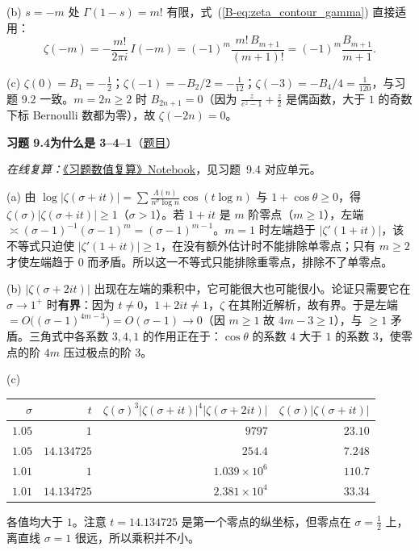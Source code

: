 \documentclass[11pt,a4paper]{article}
\newcommand{\bref}[1]{\ref*{B-#1}}
\newcommand{\Sol}[2]{%
  \par\addvspace{1.2em}\noindent
  \hypertarget{s:#1}{}\textbf{习题 #1\quad #2}\hfill{\small（\hyperlink{q:#1}{题目}）}\par
  \nopagebreak\smallskip}
\begin{document}
(b) $s=-m$ 处 $\Gamma(1-s)=m!$ 有限，式~(\bref{eq:zeta_contour_gamma}) 直接适用：
\[
  \zeta(-m)=-\frac{m!}{2\pi i}\,I(-m)=(-1)^m\frac{m!\,B_{m+1}}{(m+1)!}=(-1)^m\frac{B_{m+1}}{m+1}.
\]

(c) $\zeta(0)=B_1=-\tfrac12$；$\zeta(-1)=-B_2/2=-\tfrac1{12}$；$\zeta(-3)=-B_4/4=\tfrac1{120}$，与习题 9.2 一致。$m=2n\ge2$ 时 $B_{2n+1}=0$（因为 $\frac z{e^z-1}+\frac z2$ 是偶函数，大于 $1$ 的奇数下标 Bernoulli 数都为零），故 $\zeta(-2n)=0$。

\Sol{9.4}{为什么是 3--4--1}
\emph{在线复算：}\href{https://colab.research.google.com/github/lichengtong123/lichengtong-RH/blob/main/\%E4\%B9\%A0\%E9\%A2\%98\%E4\%B8\%8E\%E8\%A7\%A3\%E7\%AD\%94/\%E4\%B9\%A0\%E9\%A2\%98\%E6\%95\%B0\%E5\%80\%BC\%E5\%A4\%8D\%E7\%AE\%97.ipynb}{《习题数值复算》Notebook}，见习题~9.4 对应单元。

(a) 由 $\log|\zeta(\sigma+it)|=\sum\frac{\Lambda(n)}{n^\sigma\log n}\cos(t\log n)$ 与 $1+\cos\theta\ge0$，得 $\zeta(\sigma)|\zeta(\sigma+it)|\ge1$（$\sigma>1$）。若 $1+it$ 是 $m$ 阶零点（$m\ge1$），左端 $\asymp(\sigma-1)^{-1}(\sigma-1)^m=(\sigma-1)^{m-1}$。$m=1$ 时左端趋于 $|\zeta'(1+it)|$，该不等式只迫使 $|\zeta'(1+it)|\ge1$，在没有额外估计时不能排除单零点；只有 $m\ge2$ 才使左端趋于 $0$ 而矛盾。所以这一不等式只能排除重零点，排除不了单零点。

(b) $|\zeta(\sigma+2it)|$ 出现在左端的乘积中，它可能很大也可能很小。论证只需要它在 $\sigma\to1^+$ 时\textbf{有界}：因为 $t\ne0$，$1+2it\ne1$，$\zeta$ 在其附近解析，故有界。于是左端 $=O\bigl((\sigma-1)^{4m-3}\bigr)=O(\sigma-1)\to0$（因 $m\ge1$ 故 $4m-3\ge1$），与 $\ge1$ 矛盾。三角式中各系数 $3,4,1$ 的作用正在于：$\cos\theta$ 的系数 $4$ 大于 $1$ 的系数 $3$，使零点的阶 $4m$ 压过极点的阶 $3$。

(c)
\begin{center}
\begin{tabular}{rrrr}
\toprule
$\sigma$ & $t$ & $\zeta(\sigma)^3|\zeta(\sigma+it)|^4|\zeta(\sigma+2it)|$ & $\zeta(\sigma)|\zeta(\sigma+it)|$\\
\midrule
$1.05$ & $1$ & $9797$ & $23.10$\\
$1.05$ & $14.134725$ & $254.4$ & $7.248$\\
$1.01$ & $1$ & $1.039\times10^6$ & $110.7$\\
$1.01$ & $14.134725$ & $2.381\times10^4$ & $33.34$\\
\bottomrule
\end{tabular}
\end{center}
各值均大于 $1$。注意 $t=14.134725$ 是第一个零点的纵坐标，但零点在 $\sigma=\tfrac12$ 上，离直线 $\sigma=1$ 很远，所以乘积并不小。
\end{document}
